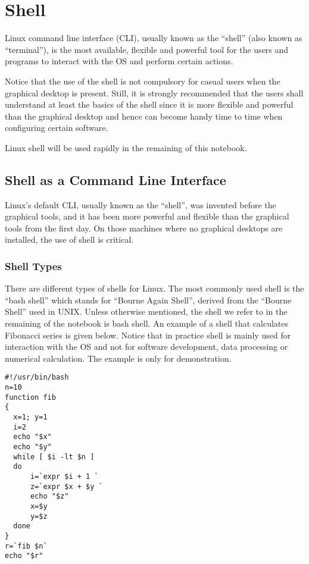 \chapter{Shell} \label{ch:sb}

Linux command line interface (CLI), usually known as the ``shell'' (also known as ``terminal''), is the most available, flexible and powerful tool for the users and programs to interact with the OS and perform certain actions.

Notice that the use of the shell is not compulsory for casual users when the graphical desktop is present. Still, it is strongly recommended that the users shall understand at least the basics of the shell since it is more flexible and powerful than the graphical desktop and hence can become handy time to time when configuring certain software.

Linux shell will be used rapidly in the remaining of this notebook.

\section{Shell as a Command Line Interface}

Linux's default CLI, usually known as the ``shell'', was invented before the graphical tools, and it has been more powerful and flexible than the graphical tools from the first day. On those machines where no graphical desktops are installed, the use of shell is critical.

\subsection{Shell Types}

There are different types of shells for Linux. The most commonly used shell is the ``bash shell'' which stands for ``Bourne Again Shell'', derived from the ``Bourne Shell'' used in UNIX. Unless otherwise mentioned, the shell we refer to in the remaining of the notebook is bash shell. An example of a shell that calculates Fibonacci series is given below. Notice that in practice shell is mainly used for interaction with the OS and not for software development, data processing or numerical calculation. The example is only for demonstration.

\begin{lstlisting}
#!/usr/bin/bash
n=10
function fib
{
  x=1; y=1
  i=2
  echo "$x"
  echo "$y"
  while [ $i -lt $n ]
  do
      i=`expr $i + 1 `
      z=`expr $x + $y `
      echo "$z"
      x=$y
      y=$z
  done
}
r=`fib $n`
echo "$r"
\end{lstlisting}

